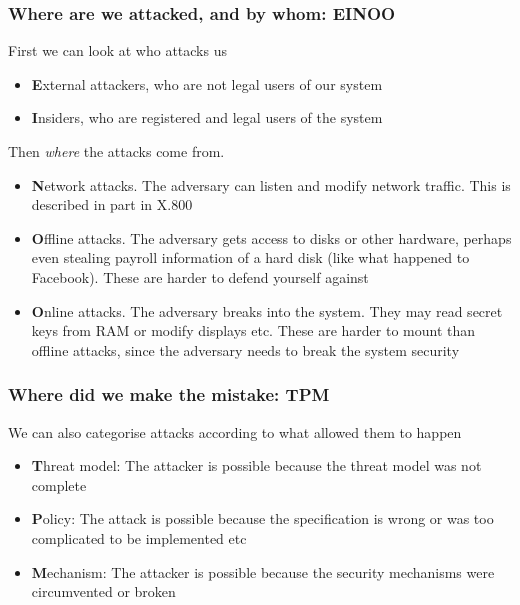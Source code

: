     \begin{frame}
        \frametitle{Where are we attacked, and by whom: EINOO}
            First we can look at who attacks us
            \begin{itemize}
                \item \textbf{E}xternal attackers, who are not legal users of our system
                \item \textbf{I}nsiders, who are registered and legal users of the system
            \end{itemize}
            Then \textit{where} the attacks come from. 
            \begin{itemize}
                \item \textbf{N}etwork attacks. The adversary can listen and modify network traffic. This is described in part in X.800
                \item \textbf{O}ffline attacks. The adversary gets access to disks or other hardware, perhaps even stealing payroll information of a hard disk (like what happened to Facebook). These are harder to defend yourself against
                \item \textbf{O}nline attacks. The adversary breaks into the system. They may read secret keys from RAM or modify displays etc. These are harder to mount than offline attacks, since the adversary needs to break the system security
            \end{itemize}
    \end{frame}
    \begin{frame}
        \frametitle{Where did we make the mistake: TPM}
            We can also categorise attacks according to what allowed them to happen
            \begin{itemize}
                \item \textbf{T}hreat model: The attacker is possible because the threat model was not complete
                \item \textbf{P}olicy: The attack is possible because the specification is wrong or was too complicated to be implemented etc
                \item \textbf{M}echanism: The attacker is possible because the security mechanisms were circumvented or broken
            \end{itemize}
    \end{frame}


